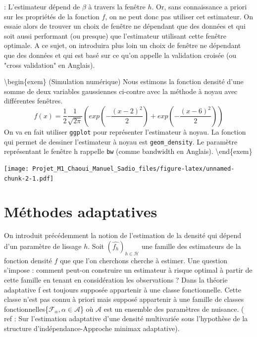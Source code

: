 \documentclass[
]{book}
\begin{document}
\begin{cmtr}: L'estimateur dépend de $\beta$ à travers la fenêtre $h$. Or, sans   connaissance a priori sur les propriétés de la fonction $f$, on ne peut donc pas utiliser cet estimateur. On essaie alors de trouver un choix de fenêtre ne dépendant que des données et qui soit aussi performant (ou presque) que l'estimateur utilisant cette fenêtre optimale. A ce sujet, on introduira plus loin un choix de fenêtre ne dépendant que des données et qui est basé sur ce qu'on appelle la validation croisée (ou "cross validation" en Anglais).  \newline
\end{cmtr}

\textbackslash begin\{exem\} (Simulation numérique)
Nous estimons la fonction densité d'une somme de deux variables gaussiennes ci-contre avec la méthode à noyau avec différentes fenêtres.
\[
f(x)=\frac{1}{2}\frac{1}{\sqrt{2\pi}}(exp(-\frac{(x-2)^2}{2})+exp(-\frac{(x-6)^2}{2}))
\]
On va en fait utiliser \texttt{ggplot} pour représenter l'estimateur à noyau. La fonction qui permet de dessiner l'estimateur à noyau est \texttt{geom\_density}. Le paramètre représentant le fenêtre h rappelle \texttt{bw} (comme bandwidth en Anglais).
\textbackslash end\{exem\}

\texttt{[image: Projet\_M1\_Chaoui\_Manuel\_Sadio\_files/figure-latex/unnamed-chunk-2-1.pdf]}

\hypertarget{muxe9thodes-adaptatives}{%
\section{Méthodes adaptatives}\label{muxe9thodes-adaptatives}}

\hspace*{0.5cm} On introduit précédemment la notion de l'estimation de la densité qui dépend d'un paramètre de lissage \(h\). Soit \((\hat{f_h})_{h\in \mathcal H}\) une famille des estimateurs de la fonction densité \(f\) que que l'on cherchons cherche à estimer.\newline
Une question s'impose : comment peut-on construire un estimateur à risque optimal à partir de cette famille en tenant en considération les observations ? \newline
Dans la théorie adaptative f est toujours supposée appartenir à une classe fonctionnelle. Cette classe n'est pas connu à priori mais supposé appartenir à une famille de classes fonctionnelles\{\(\mathcal{F_{\alpha}},\alpha \in\mathcal{A}\)\} où \(\mathcal{A}\) est un ensemble des paramètres de nuisance. ( ref : Sur l'estimation adaptative d'une densité multivariée sous l'hypothèse de la structure d'indépendance-Approche minimax adaptative).\newline
\end{document}
